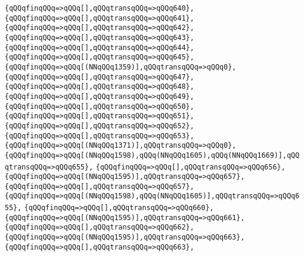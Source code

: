 \verb|{qQQqfinqQQq=>qQQq[],qQQqtransqQQq=>qQQq640},|\newline
\verb|{qQQqfinqQQq=>qQQq[],qQQqtransqQQq=>qQQq641},|\newline
\verb|{qQQqfinqQQq=>qQQq[],qQQqtransqQQq=>qQQq642},|\newline
\verb|{qQQqfinqQQq=>qQQq[],qQQqtransqQQq=>qQQq643},|\newline
\verb|{qQQqfinqQQq=>qQQq[],qQQqtransqQQq=>qQQq644},|\newline
\verb|{qQQqfinqQQq=>qQQq[],qQQqtransqQQq=>qQQq645},|\newline
\verb|{qQQqfinqQQq=>qQQq[(NNqQQq1359)],qQQqtransqQQq=>qQQq0},|\newline
\verb|{qQQqfinqQQq=>qQQq[],qQQqtransqQQq=>qQQq647},|\newline
\verb|{qQQqfinqQQq=>qQQq[],qQQqtransqQQq=>qQQq648},|\newline
\verb|{qQQqfinqQQq=>qQQq[],qQQqtransqQQq=>qQQq649},|\newline
\verb|{qQQqfinqQQq=>qQQq[],qQQqtransqQQq=>qQQq650},|\newline
\verb|{qQQqfinqQQq=>qQQq[],qQQqtransqQQq=>qQQq651},|\newline
\verb|{qQQqfinqQQq=>qQQq[],qQQqtransqQQq=>qQQq652},|\newline
\verb|{qQQqfinqQQq=>qQQq[],qQQqtransqQQq=>qQQq653},|\newline
\verb|{qQQqfinqQQq=>qQQq[(NNqQQq1371)],qQQqtransqQQq=>qQQq0},|\newline
\verb|{qQQqfinqQQq=>qQQq[(NNqQQq1598),qQQq(NNqQQq1605),qQQq(NNqQQq1669)],qQQqtransqQQq=>qQQq655},|\newline
\verb|{qQQqfinqQQq=>qQQq[],qQQqtransqQQq=>qQQq656},|\newline
\verb|{qQQqfinqQQq=>qQQq[(NNqQQq1595)],qQQqtransqQQq=>qQQq657},|\newline
\verb|{qQQqfinqQQq=>qQQq[],qQQqtransqQQq=>qQQq657},|\newline
\verb|{qQQqfinqQQq=>qQQq[(NNqQQq1598),qQQq(NNqQQq1605)],qQQqtransqQQq=>qQQq655},|\newline
\verb|{qQQqfinqQQq=>qQQq[],qQQqtransqQQq=>qQQq660},|\newline
\verb|{qQQqfinqQQq=>qQQq[(NNqQQq1595)],qQQqtransqQQq=>qQQq661},|\newline
\verb|{qQQqfinqQQq=>qQQq[],qQQqtransqQQq=>qQQq662},|\newline
\verb|{qQQqfinqQQq=>qQQq[(NNqQQq1595)],qQQqtransqQQq=>qQQq663},|\newline
\verb|{qQQqfinqQQq=>qQQq[],qQQqtransqQQq=>qQQq663},|\newline
